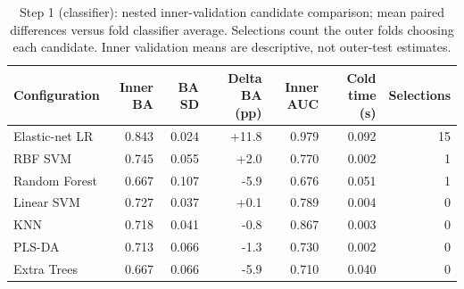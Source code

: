 \begin{table}[t]
\centering
\caption{Step 1 (classifier): nested inner-validation candidate comparison; mean paired differences versus fold classifier average. Selections count the outer folds choosing each candidate. Inner validation means are descriptive, not outer-test estimates.}
\label{tab:step1_candidates}
\footnotesize
\setlength{\tabcolsep}{4pt}
\begin{tabular}{lrrrrrr}
\toprule
Configuration & Inner BA & BA SD & Delta BA (pp) & Inner AUC & Cold time (s) & Selections \\
\midrule
Elastic-net LR & 0.843 & 0.024 & +11.8 & 0.979 & 0.092 & 15 \\
RBF SVM & 0.745 & 0.055 & +2.0 & 0.770 & 0.002 & 1 \\
Random Forest & 0.667 & 0.107 & -5.9 & 0.676 & 0.051 & 1 \\
Linear SVM & 0.727 & 0.037 & +0.1 & 0.789 & 0.004 & 0 \\
KNN & 0.718 & 0.041 & -0.8 & 0.867 & 0.003 & 0 \\
PLS-DA & 0.713 & 0.066 & -1.3 & 0.730 & 0.002 & 0 \\
Extra Trees & 0.667 & 0.066 & -5.9 & 0.710 & 0.040 & 0 \\
\bottomrule
\end{tabular}
\end{table}
